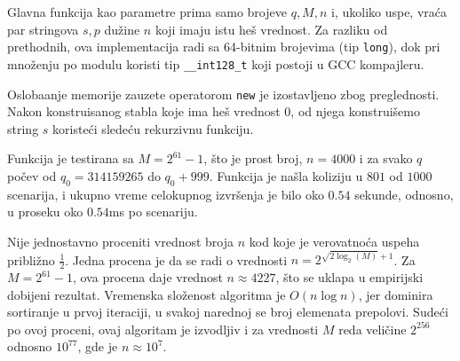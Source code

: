 \noindent
\begin{minipage}[l]{\textwidth}

\end{minipage}

Glavna funkcija kao parametre prima samo brojeve $q,M,n$ i, ukoliko uspe, vra\' ca par stringova $s,p$ du\v zine $n$ koji imaju istu he\v s vrednost. Za razliku od prethodnih, ova implementacija radi sa 64-bitnim brojevima (tip \texttt{long}), dok pri mno\v zenju po modulu koristi tip \texttt{\_\_int128\_t} koji postoji u GCC kompajleru.

\noindent
\begin{minipage}[l]{\textwidth}

\end{minipage}

Osloba\dj anje memorije zauzete operatorom \texttt{new} je izostavljeno zbog preglednosti. Nakon konstruisanog stabla koje ima he\v s vrednost $0$, od njega konstrui\v semo string $s$ koriste\' ci slede\' cu rekurzivnu funkciju.

\noindent
\begin{minipage}[l]{\textwidth}

\end{minipage}

Funkcija je testirana sa $M = 2^{61}-1$, \v sto je prost broj, $n = 4000$ i za svako $q$ po\v cev od $q_0 = 314159265$ do $q_0+999$. Funkcija je na\v sla koliziju u $801$ od $1000$ scenarija, i ukupno vreme celokupnog izvr\v senja je bilo oko $0.54$ sekunde, odnosno, u proseku oko $0.54$ms po scenariju.

Nije jednostavno proceniti vrednost broja $n$ kod koje je verovatno\' ca uspeha pribli\v zno $\frac12$. Jedna procena\cite{cfantihash} je da se radi o vrednosti $n = 2^{\sqrt{2\log_2(M)}+1}$. Za $M = 2^{61}-1$, ova procena daje vrednost $n \approx 4227$, \v sto se uklapa u empirijski dobijeni rezultat. Vremenska slo\v zenost algoritma je $O(n \log n)$, jer dominira sortiranje u prvoj iteraciji, u svakoj narednoj se broj elemenata prepolovi. Sude\' ci po ovoj proceni, ovaj algoritam je izvodljiv i za vrednosti $M$ reda veli\v cine $2^{256}$ odnosno $10^{77}$, gde je $n \approx 10^7$.
